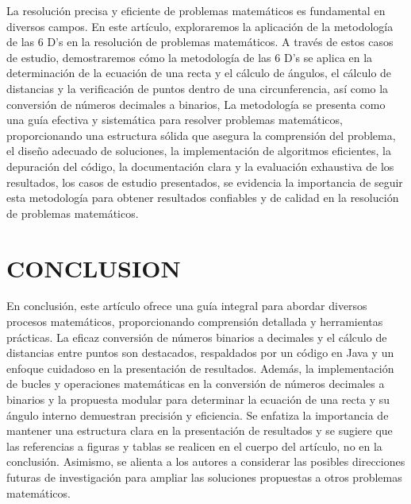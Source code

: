 \documentclass{IEEEcsmag}
\begin{document}
\maketitle
{}La resolución precisa y eficiente de problemas matemáticos es fundamental en diversos campos. En este artículo, exploraremos la aplicación de la metodología de las 6 D's en la resolución de problemas matemáticos. 
A través de estos casos de estudio, demostraremos cómo la metodología de las 6 D's se aplica en la determinación de la ecuación de una recta y el cálculo de ángulos, el cálculo de distancias y la verificación de puntos dentro de una circunferencia, 
así como la conversión de números decimales a binarios, La metodología se presenta como una guía efectiva y sistemática para resolver problemas matemáticos, proporcionando una estructura sólida que asegura la comprensión del problema, el diseño adecuado de soluciones, la implementación de algoritmos eficientes, la depuración del código, la documentación clara y la evaluación exhaustiva de los resultados, los casos de estudio presentados, se evidencia la importancia de seguir esta metodología para obtener resultados confiables y de calidad en la resolución de problemas matemáticos.
\clearpage


\clearpage


\clearpage


\clearpage


\clearpage


\clearpage


\clearpage


\section{CONCLUSION}
En conclusión, este artículo ofrece una guía integral para abordar diversos procesos matemáticos, proporcionando comprensión detallada y herramientas prácticas. La eficaz conversión de números binarios a decimales y el cálculo de distancias entre puntos son destacados, 
respaldados por un código en Java y un enfoque cuidadoso en la presentación de resultados. Además, la implementación de bucles y operaciones matemáticas en la conversión de números decimales a binarios y la propuesta modular para determinar la ecuación de una recta y su ángulo interno demuestran precisión y eficiencia. 
Se enfatiza la importancia de mantener una estructura clara en la presentación de resultados y se sugiere que las referencias a figuras y tablas se realicen en el cuerpo del artículo, no en la conclusión. Asimismo, se alienta a los autores a considerar las posibles direcciones futuras de investigación 
para ampliar las soluciones propuestas a otros problemas matemáticos.
\vspace*{-8pt}
\end{document}
